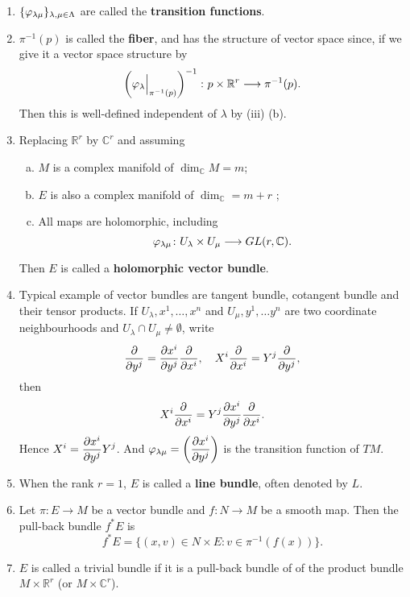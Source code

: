 \documentclass[12pt]{article}
\begin{document}
\begin{remark}\hfill
\begin{enumerate}[1.]
\item \(\{\varphi_{\lambda\mu}\}_{\lambda,\mu\in \Lambda}\) are called the
    \textbf{transition functions}.
\item \(\pi^{-1}(p)\) is called the \textbf{fiber}, and has the structure of
    vector space since, if we give it a vector space structure by \[
        \left(\varphi_\lambda\Big|_{\pi^{-1}(p)}\right)^{-1}\colon p\times
        \mathbb{R}^r\longrightarrow \pi^{-1}(p)
    .\] Then  this is well-defined independent of \(\lambda\) by (iii) (b).
\item Replacing \(\mathbb{R}^r\) by \(\mathbb{C}^r\) and assuming
    \begin{enumerate}[(a)]
    \item \(M\) is a complex manifold of \(\dim_{\mathbb{C}}M=m\);
    \item \(E\) is also a complex manifold of \(\dim_{\mathbb{C}}=m+r\) ;
    \item All maps are holomorphic, including \[
        \varphi_{\lambda\mu}\colon U_\lambda\times U_\mu\longrightarrow
        GL(r,\mathbb{C})
    .\] 
    \end{enumerate}
    Then \(E\) is called a \textbf{holomorphic vector bundle}.
\item Typical example of vector bundles are tangent bundle, cotangent bundle
    and their tensor products. If \(U_\lambda,x^1,\ldots,x^n\) and \(U_\mu,y^1,\ldots
    y^n\) are two coordinate neighbourhoods and \(U_\lambda\cap U_\mu\neq \emptyset\),
    write \[
        \pdv{y^j}=\pdv{x^i}{y^j}\pdv{x^i},\quad
        X^i\pdv{x^i}=Y^j\pdv{y^j}
    ,\] then \[
        X^i\pdv{x^i}=Y^j\pdv{x^i}{y^j}\pdv{x^i}
    .\] Hence \(X^i=\displaystyle\pdv{x^i}{y^j}Y^j\). And \(\varphi_{\lambda\mu}=\left(
    \displaystyle\pdv{x^i}{y^j}\right)\) is the transition function of \(TM\).
\item When the rank \(r=1\), \(E\) is called a \textbf{line bundle},
    often denoted by \(L\).
\item Let \(\pi\colon E\to M\) be a vector bundle and \(f\colon N\to M\) be a smooth 
    map. Then the pull-back bundle \(f^*E\) is \[
        f^*E=\{(x,v)\in N\times E:v\in \pi^{-1}(f(x))\}
    .\] 
\item \(E\) is called a trivial bundle if it is a pull-back bundle of of the product
    bundle \(M\times \mathbb{R}^r\) (or \(M\times \mathbb{C}^r\)).
\end{enumerate}
\end{remark}
\end{document}
